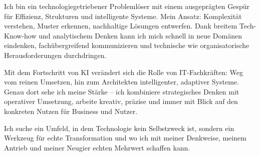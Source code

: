 

\begin{cvparagraph}

Ich bin ein technologiegetriebener Problemlöser mit einem ausgeprägten Gespür für Effizienz, Strukturen und intelligente Systeme. Mein Ansatz: Komplexität verstehen, Muster erkennen, nachhaltige Lösungen entwerfen. Dank breitem Tech-Know-how und analytischem Denken kann ich mich schnell in neue Domänen eindenken, fachübergreifend kommunizieren und technische wie organisatorische Herausforderungen durchdringen.

Mit dem Fortschritt von KI verändert sich die Rolle von IT-Fachkräften: Weg vom reinen Umsetzen, hin zum Architekten intelligenter, adaptiver Systeme. Genau dort sehe ich meine Stärke – ich kombiniere strategisches Denken mit operativer Umsetzung, arbeite kreativ, präzise und immer mit Blick auf den konkreten Nutzen für Business und Nutzer.

Ich suche ein Umfeld, in dem Technologie kein Selbstzweck ist, sondern ein Werkzeug für echte Transformation und wo ich mit meiner Denkweise, meinem Antrieb und meiner Neugier echten Mehrwert schaffen kann.
\end{cvparagraph}
